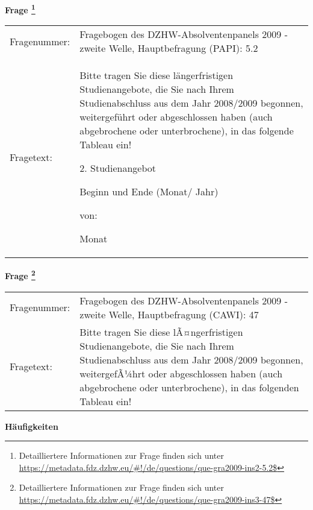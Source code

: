 				\vspace*{0.5cm}
                \noindent\textbf{Frage
	                \footnote{Detailliertere Informationen zur Frage finden sich unter
		              \url{https://metadata.fdz.dzhw.eu/\#!/de/questions/que-gra2009-ins2-5.2$}}}\\
				\begin{tabularx}{\hsize}{@{}lX}
					Fragenummer: &
					  Fragebogen des DZHW-Absolventenpanels 2009 - zweite Welle, Hauptbefragung (PAPI):
					  5.2
 \\
					Fragetext: & Bitte tragen Sie diese längerfristigen Studienangebote, die Sie nach Ihrem Studienabschluss aus dem Jahr 2008/2009 begonnen, weitergeführt oder abgeschlossen haben (auch abgebrochene oder unterbrochene), in das folgende Tableau ein!\par  2. Studienangebot\par  Beginn und Ende (Monat/ Jahr)\par  von:\par  Monat \\
				\end{tabularx}
				\vspace*{0.5cm}
                \noindent\textbf{Frage
	                \footnote{Detailliertere Informationen zur Frage finden sich unter
		              \url{https://metadata.fdz.dzhw.eu/\#!/de/questions/que-gra2009-ins3-47$}}}\\
				\begin{tabularx}{\hsize}{@{}lX}
					Fragenummer: &
					  Fragebogen des DZHW-Absolventenpanels 2009 - zweite Welle, Hauptbefragung (CAWI):
					  47
 \\
					Fragetext: & Bitte tragen Sie diese lÃ¤ngerfristigen Studienangebote, die Sie nach Ihrem Studienabschluss aus dem Jahr 2008/2009 begonnen, weitergefÃ¼hrt oder abgeschlossen haben (auch abgebrochene oder unterbrochene), in das folgenden Tableau ein! \\
				\end{tabularx}





        		\vspace*{0.5cm}
                \noindent\textbf{Häufigkeiten}

